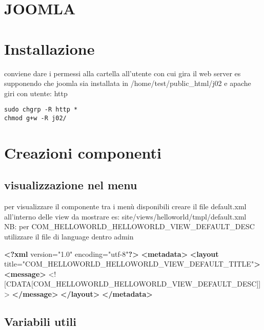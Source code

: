\documentclass[]{article}
\newenvironment{Shaded}{}{}
\newcommand{\KeywordTok}[1]{\textcolor[rgb]{0.00,0.44,0.13}{\textbf{{#1}}}}
\newcommand{\BaseNTok}[1]{\textcolor[rgb]{0.25,0.63,0.44}{{#1}}}
\newcommand{\StringTok}[1]{\textcolor[rgb]{0.25,0.44,0.63}{{#1}}}
\newcommand{\OtherTok}[1]{\textcolor[rgb]{0.00,0.44,0.13}{{#1}}}
\newcommand{\NormalTok}[1]{{#1}}
\begin{document}
\section{JOOMLA}\label{joomla}

\section{Installazione}\label{installazione}

conviene dare i permessi alla cartella all'utente con cui gira il web
server es supponendo che joomla sia installata in
/home/test/public\_html/j02 e apache giri con utente: http

\begin{verbatim}
sudo chgrp -R http *
chmod g+w -R j02/
\end{verbatim}

\section{Creazioni componenti}\label{creazioni-componenti}

\subsection{visualizzazione nel menu}\label{visualizzazione-nel-menu}

per visualizzare il componente tra i menù disponibili creare il file
default.xml all'interno delle view da mostrare es:
site/views/helloworld/tmpl/default.xml\\NB: per
COM\_HELLOWORLD\_HELLOWORLD\_VIEW\_DEFAULT\_DESC utilizzare il file di
language dentro admin

\begin{Shaded}
\begin{Highlighting}[]
\KeywordTok{<?xml} \NormalTok{version="1.0" encoding="utf-8"}\KeywordTok{?>}
\KeywordTok{<metadata>}
        \KeywordTok{<layout}\OtherTok{ title=}\StringTok{"COM_HELLOWORLD_HELLOWORLD_VIEW_DEFAULT_TITLE"}\KeywordTok{>}
                \KeywordTok{<message>}
                        \BaseNTok{<![CDATA[}\NormalTok{COM_HELLOWORLD_HELLOWORLD_VIEW_DEFAULT_DESC}\BaseNTok{]]>}
                \KeywordTok{</message>}
        \KeywordTok{</layout>}
\KeywordTok{</metadata>}
\end{Highlighting}
\end{Shaded}

\subsection{Variabili utili}\label{variabili-utili}
\end{document}
